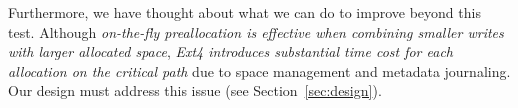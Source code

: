 Furthermore, we have thought about what
we can do to improve beyond this test. 
Although {\em on-the-fly preallocation is effective when combining smaller writes with larger allocated space}, 
{\em Ext4 introduces substantial time cost for each allocation on the critical path} due to  space management and metadata journaling.
Our design must address this issue (see Section~\ref{sec:design}).

\iftrue
\vspace{1ex}
\noindent{}
\vspace{0.5ex}
\else 
\ul{$\vmathbb{O4}$. \em
	SOTA designs targeting the software tax have   limitations.}
\fi

